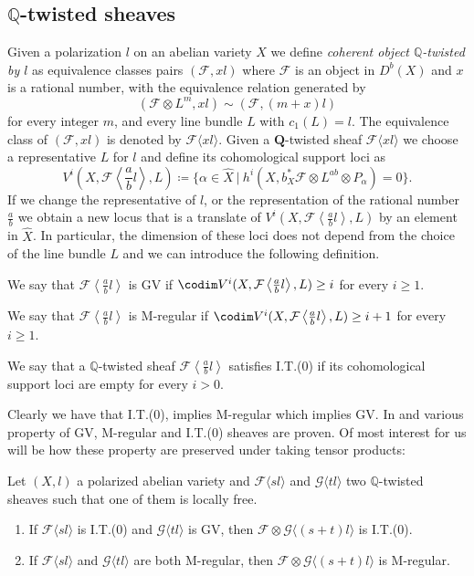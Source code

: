 \documentclass[11pt,letter]{amsart}
\numberwithin{equation}{section}
\begin{document}
\subsection{$\mathbb{Q}$-twisted sheaves}\label{sec2.2}
Given a polarization $l$ on an abelian variety $X$ we define \emph{coherent object $\mathbb{Q}$-twisted by $l$} as equivalence classes pairs $(\mathcal{F}, xl)$ where $\mathcal{F}$ is an object in $D^b(X)$ and $x$ is a rational number, with the equivalence relation generated by
$$
(\mathcal{F}\otimes L^m,xl)\sim(\mathcal{F},(m+x)l)
$$
for every integer $m$, and every line bundle $L$ with $c_1(L)=l$. The equivalence class of $(\mathcal{F},xl)$ is denoted by $\mathcal{F}\langle xl\rangle$. Given a $\mathbf{Q}$-twisted sheaf $\mathcal{F}\langle xl\rangle$ we choose a representative $L$ for $l$ and define its cohomological support loci as
$$
V^i\left(X, \mathcal{F}\left\langle \frac{a}{b}l\right\rangle, L\right)\coloneqq\{  \alpha\in\hat{X}\:|\:h^i(X, b_X^*\mathcal{F}\otimes L^{ab}\otimes P_  \alpha)=0\}.
$$
If we change the representative of $l$, or the representation of the rational number $\frac{a}{b}$ we obtain a new locus that is a translate of $V^i\left(X, \mathcal{F}\left\langle \frac{a}{b}l\right\rangle, L\right)$ by an element in $\hat{X}$. In particular, the dimension of these loci does not depend from the choice of the line bundle $L$ and we can introduce the following definition.
\begin{defi}\label{def2.1}
 We say that $\mathcal{F}\left\langle \frac{a}{b}l\right\rangle$ is GV if $\codim V^i(X,\mathcal{F}\left\langle \frac{a}{b}l\right\rangle, L)\ge i$ for every $i\ge 1$.\par
We say that $\mathcal{F}\left\langle \frac{a}{b}l\right\rangle$ is M-regular if $\codim V^i(X,\mathcal{F}\left\langle \frac{a}{b}l\right\rangle, L)\ge i+1$ for every $i\ge 1$.\par
We say that a $\mathbb{Q}$-twisted sheaf $\mathcal{F}\left\langle \frac{a}{b}l\right\rangle$ satisfies I.T.(0) if its cohomological support loci are empty for every $i>0$. 
\end{defi}
Clearly we have that I.T.(0), implies M-regular which implies GV. In \cite{Caucci} and \cite{Ito22} various property of GV, M-regular and I.T.(0) sheaves are proven. Of most interest for us will be how these property are preserved under taking tensor products:
\begin{prop}\label{caucci}
Let $(X,l)$ a polarized abelian variety and  $\mathcal{F}\langle sl\rangle$ and $\mathcal{G}\langle tl\rangle$ two $\mathbb{Q}$-twisted sheaves such that one of them is locally free.
\begin{enumerate}
\item If $\mathcal{F}\langle sl\rangle$ is I.T.(0) and $\mathcal{G}\langle tl\rangle$ is GV, then $\mathcal{F}\otimes\mathcal{G}\langle(s+t)l\rangle$ is I.T.(0).
\item If $\mathcal{F}\langle sl\rangle$ and $\mathcal{G}\langle tl\rangle$ are both M-regular, then $\mathcal{F}\otimes\mathcal{G}\langle(s+t)l\rangle$ is M-regular.
\end{enumerate}
\end{prop}
\end{document}
